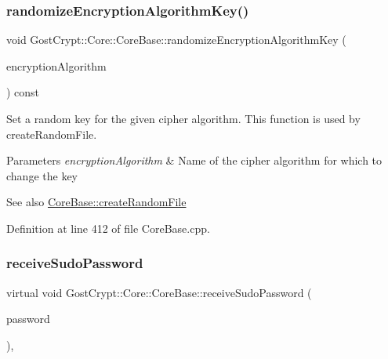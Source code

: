 \subsubsection{\texorpdfstring{randomize\+Encryption\+Algorithm\+Key()}{randomizeEncryptionAlgorithmKey()}}
{\footnotesize\ttfamily void Gost\+Crypt\+::\+Core\+::\+Core\+Base\+::randomize\+Encryption\+Algorithm\+Key (\begin{DoxyParamCaption}\item[{Q\+Shared\+Pointer$<$ \hyperlink{class_gost_crypt_1_1_volume_1_1_encryption_algorithm}{Volume\+::\+Encryption\+Algorithm} $>$}]{encryption\+Algorithm }\end{DoxyParamCaption}) const\hspace{0.3cm}{\ttfamily [protected]}}



Set a random key for the given cipher algorithm. This function is used by create\+Random\+File. 


\begin{DoxyParams}{Parameters}
{\em encryption\+Algorithm} & Name of the cipher algorithm for which to change the key \\
\hline
\end{DoxyParams}
\begin{DoxySeeAlso}{See also}
\hyperlink{class_gost_crypt_1_1_core_1_1_core_base_a4dab0d8693abc9f3356b91b0c7943ad2}{Core\+Base\+::create\+Random\+File} 
\end{DoxySeeAlso}


Definition at line 412 of file Core\+Base.\+cpp.

\mbox{\label{class_gost_crypt_1_1_core_1_1_core_base_ad0026630165d5b7229e486cca733ad05}} 
\subsubsection{\texorpdfstring{receive\+Sudo\+Password}{receiveSudoPassword}}
{\footnotesize\ttfamily virtual void Gost\+Crypt\+::\+Core\+::\+Core\+Base\+::receive\+Sudo\+Password (\begin{DoxyParamCaption}\item[{Q\+String}]{password }\end{DoxyParamCaption})\hspace{0.3cm}{\ttfamily [pure virtual]}, {\ttfamily [slot]}}



